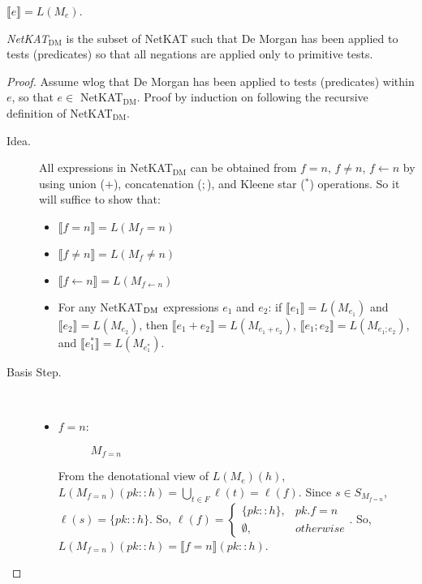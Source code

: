 \documentclass{article}
\newcommand\den[1]{\llbracket #1\rrbracket}
\renewcommand\star{^{\textstyle *}}
\begin{document}
\begin{theorem}
$\den e = L(M_e)$.
\end{theorem}

\begin{definition}
{\em NetKAT$_{\text{DM}}$} is the subset of NetKAT such that De Morgan has
been applied to tests (predicates) so that all negations are applied only to
primitive tests.
\end{definition}

\begin{proof} Assume wlog that De Morgan has been applied to tests (predicates)
within $e$, so that $e \in$ NetKAT$_{\text{DM}}$. Proof by induction on 
following the recursive definition of NetKAT$_{\text{DM}}$.

\begin{description}

\item[Idea.] All expressions in NetKAT$_{\text{DM}}$ can be obtained from 
$f=n$, $f \neq n$, $f \gets n$ by using union ($+$), concatenation ($;$), and 
Kleene star ($\star$) operations. So it will suffice to show that:
\begin{itemize}
  \item $\den{f=n} = L(M_f=n)$
  \item $\den{f \neq n} = L(M_f \neq n)$
  \item $\den{f \gets n} = L(M_{f \gets n})$
  \item For any NetKAT$_{\textnormal{DM}}$ expressions $e_1$ and $e_2$: if
  $\den{e_1} = L(M_{e_1})$ and $\den{e_2} = L(M_{e_2})$, then 
  $\den{e_1+e_2} = L(M_{e_1+e_2})$, $\den{e_1;e_2} = L(M_{e_1;e_2})$, and
  $\den{e_1\star} = L(M_{e_1\star})$.
\end{itemize}
   
  
\item[Basis Step.]
\mbox{ }
  
\begin{itemize}
  \item $f=n$:
  \begin{figure}[H]
    \centering
    \caption{$M_{f=n}$}
  \end{figure}
  
  From the denotational view of $L(M_e)(h)$,
  $L(M_{f=n})(pk::h) = \bigcup_{t\in F}\ell(t) = \ell(f)$. Since 
  $s \in S_{M_{f=n}}$, $\ell(s) = \{pk::h\}$. So, 
  $\ell(f) = \begin{cases} \{pk::h\}, & pk.f = n \\ \emptyset, 
  & otherwise \end{cases}$. So, $L(M_{f=n})(pk::h) = \den{f=n}(pk::h)$.



\end{itemize}
\end{description}
\end{proof}
\end{document}
